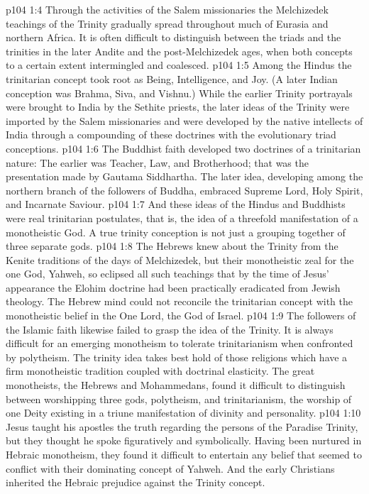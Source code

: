 \vs p104 1:4 Through the activities of the Salem missionaries the Melchizedek teachings of the Trinity gradually spread throughout much of Eurasia and northern Africa. It is often difficult to distinguish between the triads and the trinities in the later Andite and the post\hyp{}Melchizedek ages, when both concepts to a certain extent intermingled and coalesced.
\vs p104 1:5 \pc Among the Hindus the trinitarian concept took root as Being, Intelligence, and Joy. (A later Indian conception was Brahma, Siva, and Vishnu.) While the earlier Trinity portrayals were brought to India by the Sethite priests, the later ideas of the Trinity were imported by the Salem missionaries and were developed by the native intellects of India through a compounding of these doctrines with the evolutionary triad conceptions.
\vs p104 1:6 The Buddhist faith developed two doctrines of a trinitarian nature: The earlier was Teacher, Law, and Brotherhood; that was the presentation made by Gautama Siddhartha. The later idea, developing among the northern branch of the followers of Buddha, embraced Supreme Lord, Holy Spirit, and Incarnate Saviour.
\vs p104 1:7 And these ideas of the Hindus and Buddhists were real trinitarian postulates, that is, the idea of a threefold manifestation of a monotheistic God. A true trinity conception is not just a grouping together of three separate gods.
\vs p104 1:8 \pc The Hebrews knew about the Trinity from the Kenite traditions of the days of Melchizedek, but their monotheistic zeal for the one God, Yahweh, so eclipsed all such teachings that by the time of Jesus’ appearance the Elohim doctrine had been practically eradicated from Jewish theology. The Hebrew mind could not reconcile the trinitarian concept with the monotheistic belief in the One Lord, the God of Israel.
\vs p104 1:9 The followers of the Islamic faith likewise failed to grasp the idea of the Trinity. It is always difficult for an emerging monotheism to tolerate trinitarianism when confronted by polytheism. The trinity idea takes best hold of those religions which have a firm monotheistic tradition coupled with doctrinal elasticity. The great monotheists, the Hebrews and Mohammedans, found it difficult to distinguish between worshipping three gods, polytheism, and trinitarianism, the worship of one Deity existing in a triune manifestation of divinity and personality.
\vs p104 1:10 \pc Jesus taught his apostles the truth regarding the persons of the Paradise Trinity, but they thought he spoke figuratively and symbolically. Having been nurtured in Hebraic monotheism, they found it difficult to entertain any belief that seemed to conflict with their dominating concept of Yahweh. And the early Christians inherited the Hebraic prejudice against the Trinity concept.
